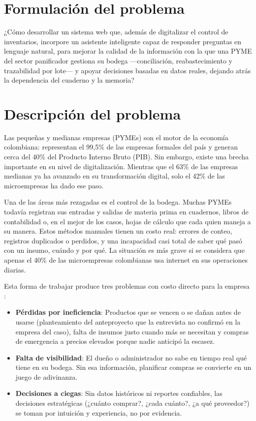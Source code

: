 
\section{Formulación del problema}

¿Cómo desarrollar un sistema web que, además de digitalizar el control de inventarios, incorpore un asistente inteligente capaz de responder preguntas en lenguaje natural, para mejorar la calidad de la información con la que una PYME del sector panificador gestiona su bodega ---conciliación, reabastecimiento y trazabilidad por lote--- y apoyar decisiones basadas en datos reales, dejando atrás la dependencia del cuaderno y la memoria?

\section{Descripción del problema}

Las pequeñas y medianas empresas (PYMEs) son el motor de la economía colombiana: representan el 99,5\% de las empresas formales del país y generan cerca del 40\% del Producto Interno Bruto (PIB).\cite{bbva2024mipymes} Sin embargo, existe una brecha importante en su nivel de digitalización. Mientras que el 63\% de las empresas medianas ya ha avanzado en su transformación digital, solo el 42\% de las microempresas ha dado ese paso.\cite{innpulsa_transformacion}

Una de las áreas más rezagadas es el control de la bodega. Muchas PYMEs todavía registran sus entradas y salidas de materia prima en cuadernos, libros de contabilidad o, en el mejor de los casos, hojas de cálculo que cada quien maneja a su manera.\cite{bbva2024mipymes} Estos métodos manuales tienen un costo real: errores de conteo, registros duplicados o perdidos, y una incapacidad casi total de saber qué pasó con un insumo, cuándo y por qué. La situación es más grave si se considera que apenas el 40\% de las microempresas colombianas usa internet en sus operaciones diarias.\cite{bbva2024mipymes}

Esta forma de trabajar produce tres problemas con costo directo para la empresa \cite{ballou2004logistica}:

\begin{itemize}
    \item \textbf{Pérdidas por ineficiencia}: Productos que se vencen o se dañan antes de usarse (planteamiento del anteproyecto que la entrevista no confirmó en la empresa del caso), falta de insumos justo cuando más se necesitan y compras de emergencia a precios elevados porque nadie anticipó la escasez.
    \item \textbf{Falta de visibilidad}: El dueño o administrador no sabe en tiempo real qué tiene en su bodega. Sin esa información, planificar compras se convierte en un juego de adivinanza.
    \item \textbf{Decisiones a ciegas}: Sin datos históricos ni reportes confiables, las decisiones estratégicas (¿cuánto comprar?, ¿cada cuánto?, ¿a qué proveedor?) se toman por intuición y experiencia, no por evidencia.
\end{itemize}

